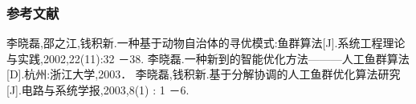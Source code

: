 \begin{frame}
	\frametitle{参考文献}
	\begin{thebibliography}{123456} 
	 李晓磊,邵之江,钱积新.一种基于动物自治体的寻优模式:鱼群算法[J].系统工程理论与实践,2002,22(11):32 －38.
	 李晓磊.一种新到的智能优化方法———人工鱼群算法[D].杭州:浙江大学,2003．
	李晓磊,钱积新.基于分解协调的人工鱼群优化算法研究[J].电路与系统学报,2003,8(1) : 1 －6.
	\end{thebibliography}
\end{frame}